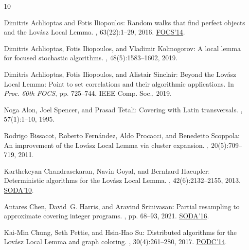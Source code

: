 \documentclass[11pt]{article}
\begin{document}
\tocrefpdfbookmark
\begin{thebibliography}{10}

{\sc Dimitris Achlioptas and Fotis Iliopoulos}: Random walks that find perfect
  objects and the {L}ov\'{a}sz {L}ocal {L}emma.
, 63(22):1--29, 2016.
\newblock \prelim \href{https://doi.org/10.1109/FOCS.2014.59}{FOCS'14}.
\newblock [\epfmtdoi{10.1145/2818352}]

{\sc Dimitris Achlioptas, Fotis Iliopoulos, and Vladimir Kolmogorov}: A local
  lemma for focused stochastic algorithms.
, 48(5):1583--1602, 2019.
\newblock [\epfmtdoi{10.1137/16M109332X}]

{\sc Dimitris Achlioptas, Fotis Iliopoulos, and Alistair Sinclair}: Beyond the
  {L}ov{\'a}sz {L}ocal {L}emma: Point to set correlations and their algorithmic
  applications.
\newblock In {\em Proc. 60th FOCS}, pp. 725--744. IEEE Comp. Soc., 2019.

{\sc Noga Alon, Joel Spencer, and Prasad Tetali}: Covering with {L}atin
  transversals.
, 57(1):1--10, 1995.
\newblock [\epfmtdoi{10.1016/0166-218X(93)E0136-M}]

{\sc Rodrigo Bissacot, Roberto Fern{\'{a}}ndez, Aldo Procacci, and Benedetto
  Scoppola}: An improvement of the {L}ov{\'{a}}sz {L}ocal {L}emma via cluster
  expansion.
, 20(5):709--719, 2011.
\newblock [\epfmtdoi{10.1017/S0963548311000253}]

{\sc Karthekeyan Chandrasekaran, Navin Goyal, and Bernhard Haeupler}:
  Deterministic algorithms for the {L}ov{\'{a}}sz {L}ocal {L}emma.
, 42(6):2132--2155, 2013.
\newblock \prelim \href{https://doi.org/10.1137/1.9781611973075.80}{SODA'10}.
\newblock [\epfmtdoi{10.1137/100799642}]

{\sc Antares Chen, David~G. Harris, and Aravind Srinivasan}: Partial resampling
  to approximate covering integer programs.
, pp. 68--93, 2021.
\newblock \prelim
  \href{https://doi.org/10.1137/1.9781611974331.ch139}{SODA'16}.

{\sc Kai-Min Chung, Seth Pettie, and Hsin-Hao Su}: Distributed algorithms for
  the {L}ov{\'a}sz {L}ocal {L}emma and graph coloring.
, 30(4):261--280, 2017.
\newblock \prelim \href{https://doi.org/10.1145/2611462.2611465}{PODC'14}.
\newblock [\epfmtdoi{10.1007/s00446-016-0287-6}]


\end{thebibliography}
\end{document}
